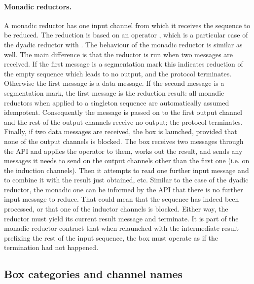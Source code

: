 \documentclass[11pt]{report}
\begin{document}
\paragraph{Monadic reductors.} A monadic reductor has one input channel from which it receives the sequence to be reduced. The reduction is based on an operator
, which is a particular case of the dyadic reductor with .  The behaviour of the monadic reductor is similar as well.
The main difference is that the reductor is run when two messages are received. If the first message is a segmentation mark this indicates reduction of the empty sequence which leads to no output, and the protocol terminates. Otherwise the first message is a data message. If the second message is a segmentation mark, the first message is the reduction result: all monadic reductors when applied to a singleton sequence are automatically assumed idempotent. Consequently the message is passed on to the first output channel and the rest of the output channels receive no output; the protocol terminates. Finally, if two data messages are received, the box is launched, provided that none of the output channels is blocked. The box receives two messages through the API and applies the  operator to them, works out the result, and sends any messages it needs to send on the output channels other than the first one (i.e. on the induction channels). Then it attempts to read one further input message and to combine it with the result just obtained, etc. Similar to the case of the dyadic reductor,  the monadic one can be informed by the API that there is no further input message to reduce. That could mean that the sequence has indeed been processed, or that one of the inductor channels is blocked. Either way, the reductor must yield its current result message and terminate. It is part of the monadic reductor contract that when relaunched with the intermediate result prefixing the rest of the input sequence, the box must operate as if the termination had not happened.

\subsection{Box categories and channel names\label{sec:category}}
\end{document}
